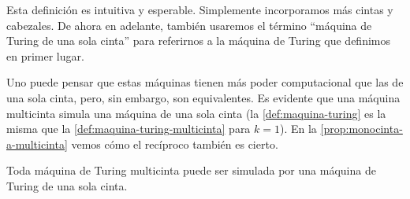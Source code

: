 Esta definición es intuitiva y esperable. Simplemente incorporamos más cintas y cabezales. De ahora en adelante, también usaremos el término ``máquina de Turing de una sola cinta'' para referirnos a la máquina de Turing que definimos en primer lugar.

Uno puede pensar que estas máquinas tienen más poder computacional que las de una sola cinta, pero, sin embargo, son equivalentes. Es evidente que una máquina multicinta simula una máquina de una sola cinta (la \cref{def:maquina-turing} es la misma que la \cref{def:maquina-turing-multicinta} para $k=1$). En la \cref{prop:monocinta-a-multicinta} vemos cómo el recíproco también es cierto.

\begin{proposicion}\label{prop:monocinta-a-multicinta}
Toda máquina de Turing multicinta puede ser simulada por una máquina de Turing de una sola cinta.
\end{proposicion}
